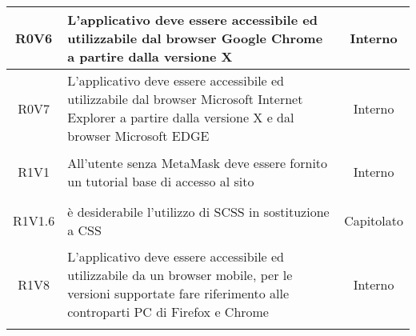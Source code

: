 \begin{longtable}{|c|>{\centering}m{7cm}|c|}
\hypertarget{R0V6}{R0V6} & L'applicativo deve essere accessibile ed utilizzabile dal browser Google Chrome a partire dalla versione X & Interno \\ \hline 
\hypertarget{R0V7}{R0V7} & L'applicativo deve essere accessibile ed utilizzabile dal browser Microsoft Internet Explorer a partire dalla versione X e dal browser Microsoft EDGE & Interno \\ \hline 
\hypertarget{R1V1}{R1V1} & All'utente senza MetaMask deve essere fornito un tutorial base di accesso al sito & Interno \\ \hline 
\hypertarget{R1V1.6}{R1V1.6} & è desiderabile l'utilizzo di SCSS in sostituzione a CSS & Capitolato \\ \hline 
\hypertarget{R1V8}{R1V8} & L'applicativo deve essere accessibile ed utilizzabile da un browser mobile, per le versioni supportate fare riferimento alle controparti PC di Firefox e Chrome & Interno \\ \hline 
\caption[Requisiti Di Vincolo]{Requisiti Di Vincolo
\label{tabella:req3}
\end{longtable}
\clearpage
